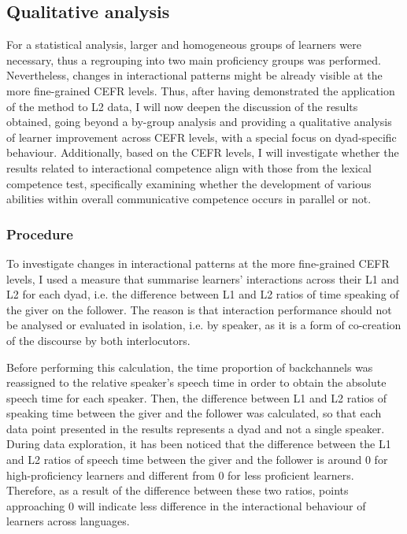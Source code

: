 \subsection{Qualitative analysis}
\hypertarget{Toc191305936}{}\begin{styleStandard}
For a statistical analysis, larger and homogeneous groups of learners were necessary, thus a regrouping into two main proficiency groups was performed. Nevertheless, changes in interactional patterns might be already visible at the more fine-grained CEFR levels. Thus, after having demonstrated the application of the method to L2 data, I will now deepen the discussion of the results obtained, going beyond a by-group analysis and providing a qualitative analysis of learner improvement across CEFR levels, with a special focus on dyad-specific behaviour. Additionally, based on the CEFR levels, I will investigate whether the results related to interactional competence align with those from the lexical competence test, specifically examining whether the development of various abilities within overall communicative competence occurs in parallel or not.
\end{styleStandard}

\subsubsection{Procedure}
\hypertarget{Toc191305937}{}\begin{styleStandard}
To investigate changes in interactional patterns at the more fine-grained CEFR levels, I used a measure that summarise learners’ interactions across their L1 and L2 for each dyad, i.e. the difference between L1 and L2 ratios of time speaking of the giver on the follower. The reason is that interaction performance should not be analysed or evaluated in isolation, i.e. by speaker, as it is a form of co-creation of the discourse by both interlocutors. 
\end{styleStandard}

\begin{styleStandard}
Before performing this calculation, the time proportion of backchannels was reassigned to the relative speaker’s speech time in order to obtain the absolute speech time for each speaker. Then, the difference between L1 and L2 ratios of speaking time between the giver and the follower was calculated, so that each data point presented in the results represents a dyad and not a single speaker. During data exploration, it has been noticed that the difference between the L1 and L2 ratios of speech time between the giver and the follower is around 0 for high-proficiency learners and different from 0 for less proficient learners. Therefore, as a result of the difference between these two ratios, points approaching 0 will indicate less difference in the interactional behaviour of learners across languages.
\end{styleStandard}


